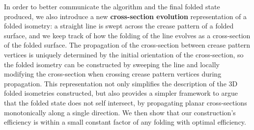 In order to better communicate the algorithm and the final folded state
produced, we also introduce a new {\bf cross-section evolution} representation
of a folded isometry: a straight line is swept across the crease pattern of a
folded surface, and we keep track of how the folding of the line evolves as a
cross-section of the folded surface. The propagation of the cross-section
between crease pattern vertices is uniquely determined by the initial
orientation of the cross-section, so the folded isometry can be constructed by
sweeping the line and locally modifying the cross-section when crossing crease
pattern vertices during propagation. This representation not only simplifies the
description of the 3D folded isometries constructed, but also provides a simpler
framework to argue that the folded state does not self intersect, by propagating
planar cross-sections monotonically along a single direction. We then
show that our construction's efficiency is within a small constant factor of
any folding with optimal efficiency.
